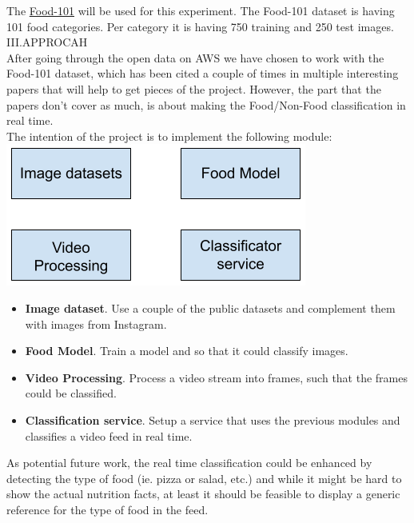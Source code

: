 \documentclass{IEEEtran}
\begin{document}
The \href{https://registry.opendata.aws/fast-ai-imageclas/}{Food-101} will be used for this experiment. The Food-101 dataset is having 101 food categories. Per category it is having 750 training and 250 test images.\\

III.APPROCAH \\

After going through the open data on AWS we have chosen to work with the Food-101 dataset, which has been cited a couple of times in multiple interesting papers that will help to get pieces of the project. However, the part that the papers don’t cover as much, is about making the Food/Non-Food classification in real time.\\

The intention of the project is to implement the following module:\\

\includegraphics[scale=0.5]{modules}\\

\begin{itemize}
\item \textbf{Image dataset}.
Use a couple of the public datasets and complement them with images from Instagram. 

\item \textbf{Food Model}.
Train a model and so that it could classify images.

\item \textbf{Video Processing}.
Process a video stream into frames, such that the frames could be classified.

\item \textbf{Classification service}.
Setup a service that uses the previous modules and classifies a video feed in real time.\\
\end{itemize}


As potential future work, the real time classification could be enhanced by detecting the type of food (ie. pizza or salad, etc.) and while it might be hard to show the actual nutrition facts, at least it should be feasible to display a generic reference for the type of food in the feed.\\
\end{document}
